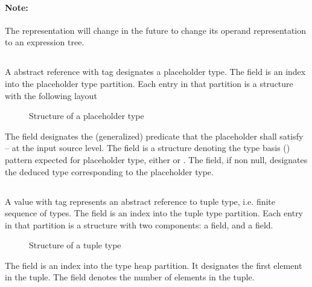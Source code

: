 
\paragraph{Note:} The  representation will change in the future to change its operand representation to an expression tree.

\subsection{}
\label{sec:ifc:TypeSort:Placeholder}

A  abstract reference with tag 
 designates a placeholder type.
The  field is an index into the placeholder type partition.
Each entry in that partition is a structure with the following layout
%
\begin{figure}[H]
	\centering
	\caption{Structure of a placeholder type}
	\label{fig:ifc-placeholder-type-structure}
\end{figure}
%
The  field designates the (generalized) predicate that the placeholder
shall satisfy -- at the input source level.
The  field is a structure denoting the type basis
() pattern expected for placeholder type,
either  or .
The  field, if non null, designates the deduced type corresponding to the placeholder type.


\subsection{}
\label{sec:ifc:TypeSort:Tuple}

A  value with tag  represents
an abstract reference to tuple type, i.e. finite sequence of types.
The  field is an index into the tuple type partition.
Each entry in that partition is a structure with two components: a  field,
and a  field.
%
\begin{figure}[H]
	\centering
	\caption{Structure of a tuple type}
	\label{fig:ifc-tuple-type-structure}
\end{figure}
%
The  field is an index into the type heap partition.  It designates the first element
in the tuple.
The  field denotes the number of elements in the tuple.

